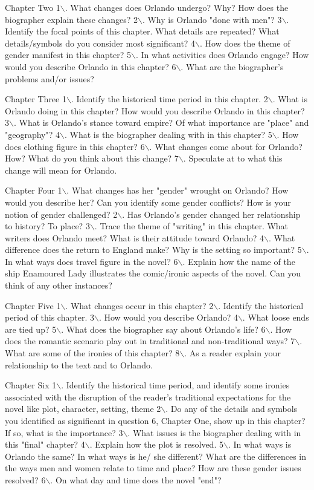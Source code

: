 \documentclass[11pt]{article}
\begin{document}
Chapter Two  
1$\backslash$. What changes does Orlando undergo? Why? How does the biographer explain these changes?  
2$\backslash$. Why is Orlando "done with men"?  
3$\backslash$. Identify the focal points of this chapter. What details are repeated? What details/symbols do you consider most significant?  
4$\backslash$. How does the theme of gender manifest in this chapter?  
5$\backslash$. In what activities does Orlando engage? How would you describe Orlando in this chapter?  
6$\backslash$. What are the biographer's problems and/or issues?

Chapter Three  
1$\backslash$. Identify the historical time period in this chapter.  
2$\backslash$. What is Orlando doing in this chapter? How would you describe Orlando in this chapter?  
3$\backslash$. What is Orlando's stance toward empire? Of what importance are "place" and "geography"?  
4$\backslash$. What is the biographer dealing with in this chapter?  
5$\backslash$. How does clothing figure in this chapter?  
6$\backslash$. What changes come about for Orlando? How? What do you think about this change?  
7$\backslash$. Speculate at to what this change will mean for Orlando.

Chapter Four  
1$\backslash$. What changes has her "gender" wrought on Orlando? How would you describe her? Can you identify some gender conflicts? How is your notion of gender challenged?  
2$\backslash$. Has Orlando's gender changed her relationship to history? To place?  
3$\backslash$. Trace the theme of "writing" in this chapter. What writers does Orlando meet? What is their attitude toward Orlando?  
4$\backslash$. What difference does the return to England make? Why is the setting so important?  
5$\backslash$. In what ways does travel figure in the novel?  
6$\backslash$. Explain how the name of the ship Enamoured Lady illustrates the comic/ironic aspects of the novel. Can you think of any other instances?

Chapter Five  
1$\backslash$. What changes occur in this chapter?  
2$\backslash$. Identify the historical period of this chapter.  
3$\backslash$. How would you describe Orlando?  
4$\backslash$. What loose ends are tied up?  
5$\backslash$. What does the biographer say about Orlando's life?  
6$\backslash$. How does the romantic scenario play out in traditional and non-traditional ways?  
7$\backslash$. What are some of the ironies of this chapter?  
8$\backslash$. As a reader explain your relationship to the text and to Orlando.

Chapter Six  
1$\backslash$. Identify the historical time period, and identify some ironies associated with the disruption of the reader's traditional expectations for the novel like plot, character, setting, theme  
2$\backslash$. Do any of the details and symbols you identified as significant in question 6, Chapter One, show up in this chapter? If so, what is the importance?  
3$\backslash$. What issues is the biographer dealing with in this "final" chapter?  
4$\backslash$. Explain how the plot is resolved.  
5$\backslash$. In what ways is Orlando the same? In what ways is he/ she different? What are the differences in the ways men and women relate to time and place? How are these gender issues resolved?  
6$\backslash$. On what day and time does the novel "end"?
\end{document}
